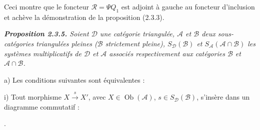 Ceci montre que le foncteur $\mathcal R=\Psi Q_1$ est adjoint à gauche au
foncteur d'inclusion et achève la démonstration de la proposition (2.3.3).

\begingroup\itshape
{}
\medskip
\noindent\textbf{Proposition 2.3.5.}\quad
{}
Soient $\mathcal D$ une catégorie triangulée, $\mathcal A$ et $\mathcal B$
deux sous-catégories triangulées pleines ($\mathcal B$ strictement pleine),
$S_{\mathcal D}(\mathcal B)$ et
$S_{\mathcal A}(\mathcal A\cap\mathcal B)$ les systèmes multiplicatifs de
$\mathcal D$ et $\mathcal A$ associés respectivement aux catégories
$\mathcal B$ et $\mathcal A\cap\mathcal B$.

\par\noindent a) Les conditions suivantes sont équivalentes :

\par\noindent\hspace{1.2em}i) Tout morphisme
$X\xrightarrow{s}X'$, avec $X\in\operatorname{Ob}(\mathcal A)$,
$s\in S_{\mathcal D}(\mathcal B)$, s'insère dans un diagramme commutatif :

\begin{center}
  \quad .
\end{center}
\endgroup
\endgroup
